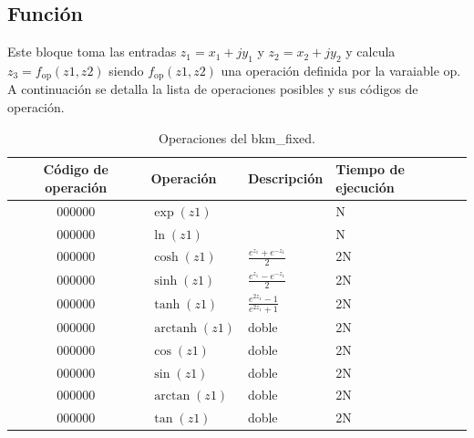 \documentclass[10pt,a4paper]{book}
\DeclareMathOperator\arctanh{arctanh}
\begin{document}
      \subsection{Funci\'on}
      Este bloque toma las entradas $z_1 = x_1+j y_1$ y $z_2 = x_2+j y_2$ y calcula $z_3 = f_{\text{op}}(z1,z2)$ siendo $f_{\text{op}}(z1,z2)$ una operaci\'on definida por la varaiable op.
      A continuaci\'on se detalla la lista de operaciones posibles y sus c\'odigos de operaci\'on.

      \begin{table}[h]
      \centering
      \begin{tabular}{clll}
         \hline
         Código de operación  &  Operación      &  Descripci\'on                 &  Tiempo de ejecuci\'on          \\ \hline \hline
         000000               &  $\exp(z1)$     &                                &  N                              \\ \hline
         000000               &  $\ln(z1)$      &                                &  N                              \\ \hline
         000000               &  $\cosh(z1)$    &  $\frac{e^{z_1}+e^{-z_1}}{2}$  &  2N                             \\ \hline
         000000               &  $\sinh(z1)$    &  $\frac{e^{z_1}-e^{-z_1}}{2}$  &  2N                             \\ \hline
         000000               &  $\tanh(z1)$    &  $\frac{e^{2z_1}-1}{e^{2z_1}+1}$  &  2N                             \\ \hline
         000000               &  $\arctanh(z1)$ &  doble                         &  2N                             \\ \hline
         000000               &  $\cos(z1)$     &  doble                         &  2N                             \\ \hline
         000000               &  $\sin(z1)$     &  doble                         &  2N                             \\ \hline
         000000               &  $\arctan(z1)$  &  doble                         &  2N                             \\ \hline
         000000               &  $\tan(z1)$     &  doble                         &  2N                             \\ \hline
      \end{tabular}
      \caption{Operaciones del bkm\_fixed.}
      \label{tab:bkm_fixed_operations}
      \end{table}
\end{document}
